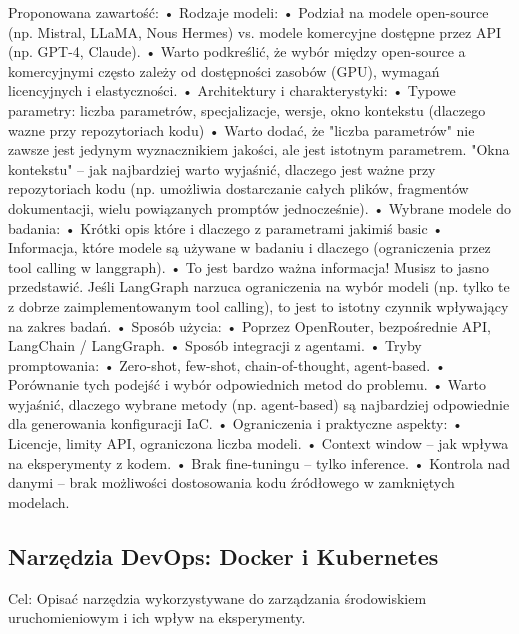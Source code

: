 Proponowana zawartość:
	•	Rodzaje modeli:
	•	    Podział na modele open-source (np. Mistral, LLaMA, Nous Hermes) vs. modele komercyjne dostępne przez API (np. GPT-4, Claude).
	•		Warto podkreślić, że wybór między open-source a komercyjnymi często zależy od dostępności zasobów (GPU), wymagań licencyjnych i elastyczności.
	•	Architektury i charakterystyki:
	•	    Typowe parametry: liczba parametrów, specjalizacje, wersje, okno kontekstu (dlaczego wazne przy repozytoriach kodu)
	•		Warto dodać, że "liczba parametrów" nie zawsze jest jedynym wyznacznikiem jakości, ale jest istotnym parametrem. "Okna kontekstu" – jak najbardziej warto wyjaśnić, dlaczego jest ważne przy repozytoriach kodu (np. umożliwia dostarczanie całych plików, fragmentów dokumentacji, wielu powiązanych promptów jednocześnie).
    •   Wybrane modele do badania:
    •       Krótki opis które i dlaczego z parametrami jakimiś basic
	• 		Informacja, które modele są używane w badaniu i dlaczego (ograniczenia przez tool calling w langgraph).
	•		To jest bardzo ważna informacja! Musisz to jasno przedstawić. Jeśli LangGraph narzuca ograniczenia na wybór modeli (np. tylko te z dobrze zaimplementowanym tool calling), to jest to istotny czynnik wpływający na zakres badań.
	•	Sposób użycia:
	•	    Poprzez OpenRouter, bezpośrednie API, LangChain / LangGraph.
	•	    Sposób integracji z agentami.
	•	Tryby promptowania:
	•	    Zero-shot, few-shot, chain-of-thought, agent-based.
	•	    Porównanie tych podejść i wybór odpowiednich metod do problemu.
	•		Warto wyjaśnić, dlaczego wybrane metody (np. agent-based) są najbardziej odpowiednie dla generowania konfiguracji IaC.
	•	Ograniczenia i praktyczne aspekty:
	•	    Licencje, limity API, ograniczona liczba modeli.
	•	    Context window – jak wpływa na eksperymenty z kodem.
	•	    Brak fine-tuningu – tylko inference.
	•	    Kontrola nad danymi – brak możliwości dostosowania kodu źródłowego w zamkniętych modelach.



\subsection{Narzędzia DevOps: Docker i Kubernetes}

Cel: Opisać narzędzia wykorzystywane do zarządzania środowiskiem uruchomieniowym i ich wpływ na eksperymenty.

